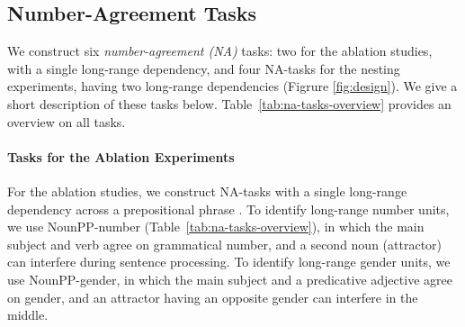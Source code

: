 \subsection{Number-Agreement Tasks}
We construct six \emph{number-agreement (NA)} tasks: two for the ablation studies, with a single long-range dependency, and four NA-tasks for the nesting experiments, having two long-range dependencies (Figrure \ref{fig:design}). We give a short description of these tasks below. Table~\ref{tab:na-tasks-overview} provides an overview on all tasks. 



\paragraph{Tasks for the Ablation Experiments} For the ablation studies, we construct NA-tasks with a single long-range dependency across a prepositional phrase \citep{lakretz2019emergence}. To identify long-range number units, we use NounPP-number (Table~\ref{tab:na-tasks-overview}), in which the main subject and verb agree on grammatical number, and a second noun (attractor) can interfere during sentence processing. To identify long-range gender units, we use NounPP-gender, in which the main subject and a predicative adjective agree on gender, and an attractor having an opposite gender can interfere in the middle. 

